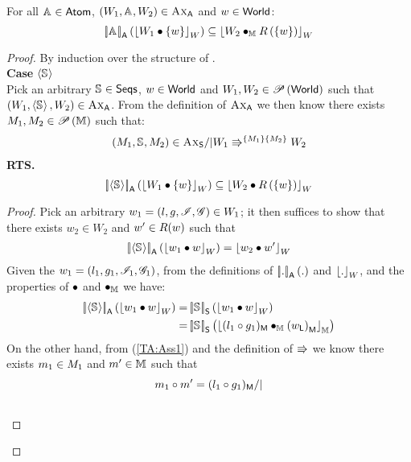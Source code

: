 \begin{theorem}\label{thrm:atomic-soundness}
For all $\atom{} \in \Atoms$, $\left(W_1, \atom{}, W_2\right) \in \AxiomsA$ and $w \in \Worlds$:
%
\[
	\opSemA{\atom{}}{\reifyW{W_1 \composeW \{w\}}} \subseteq \reifyW{W_2 \composeH \rely\left(\{w\}\right)}
\]
%
\begin{proof}
By induction over the structure of \atom{}.\\

\noindent\textbf{Case \hspace*{0.3cm}}$\atomic{\seq{}}$\\
Pick an arbitrary $\seq{} \in \Seqs$, $w \in \Worlds$ and $W_1, W_2 \in \pset{\Worlds}$ such that $\left(W_1, \atomic{\seq{}}, W_2\right) \in \AxiomsA$. From the definition of $\AxiomsA$ we then know there exists $\Hp{1}, \Hp{2} \in \pset{\Heaps}$ such that:
%
\begin{align}	
	(\Hp{1}, \seq{}, \Hp{2}) \in \AxiomsSeq /| \repartitions{W_1}{W_2}{\Hp{1}}{\Hp{2}} \label{TA:Ass1}
\end{align}
%
\textbf{RTS.}
%
\[
	\opSemA{\atomic{\seq{}}}{\reifyW{W_1 \composeW \{w\}}} \subseteq \reifyW{W_2 \composeW \rely\left(\{w\}\right)}
\]
%
\begin{proof}
Pick an arbitrary $w_1 = (l, g, \lmod, \gmod) \in W_1$; it then suffices to show that there exists $w_2 \in W_2$ and $w' \in \rely(w)$ such that 
%
\begin{align}
	\opSemA{\atomic{\seq{}}}{\reifyW{w_1 \composeW w}} = \reifyW{w_2 \composeW w'}
	\label{TA:Goal1}
\end{align}
%
Given the $w_1 = (l_1, g_1, \lmod_1, \gmod_1)$, from the definitions of $\opSemA{.}{.}$ and $\reifyW{.}$, and the properties of $\composeW$ and $\composeH$ we have:
%
\begin{align}
	\opSemA{\atomic{\seq{}}}{\reifyW{w_1 \composeW w}} = & \opSemSeq{\seq{}}{\reifyW{w_1 \composeW w}} \nonumber\\
	 = & \opSemSeq{\seq{}}{\reifyH{\heapPart{(l_1  \composeL  g_1)} \composeH \heapPart{\left(\localPart{w}\right)}}}
	\label{TA:Ass2}
\end{align}
On the other hand, from (\ref{TA:Ass1}) and the definition of $\semimplies$ we know there exists $\h{1} \in \Hp{1}$ and $\h{}' \in \Heaps$ such that
%
\begin{align}
	& m_1 \composeL m' = \heapPart{(l_1  \composeL  g_1)} /| \label{TA:Ass3}\\
	& \begin{array}{@{} l @{} }

\end{array}
\end{align}
\end{proof}
\end{proof}
\end{theorem}
